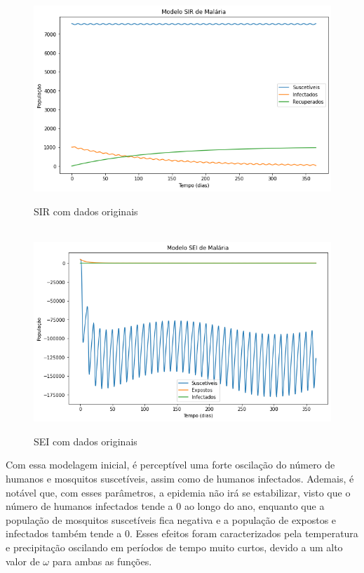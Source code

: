 \documentclass[12pt]{article}
\begin{document}
\begin{figure}[!ht]
        \centering
        \hbox{\hspace{3.6em} \includegraphics[scale=0.475] {SIR_Dados_Originais_Parham_Michael.png}}
        \caption{SIR com dados originais}
\end{figure} 
\begin{figure}[!ht]
        \centering
        \hbox{\hspace{2.7em} \includegraphics[scale=0.475] {SEI_Dados_Originais_Parham_Michael.png}}
        \caption{SEI com dados originais}
\end{figure} 
\newpage
Com essa modelagem inicial, é perceptível uma forte oscilação do número de humanos e mosquitos suscetíveis, assim como de humanos infectados. Ademais, é notável que, com esses parâmetros, a epidemia não irá se estabilizar, visto que o número de humanos infectados tende a 0 ao longo do ano, enquanto que a população de mosquitos suscetíveis fica negativa e a população de expostos e infectados também tende a 0. Esses efeitos foram caracterizados pela temperatura e precipitação oscilando em períodos de tempo muito curtos, devido a um alto valor de $\omega$ para ambas as funções. 
\end{document}
